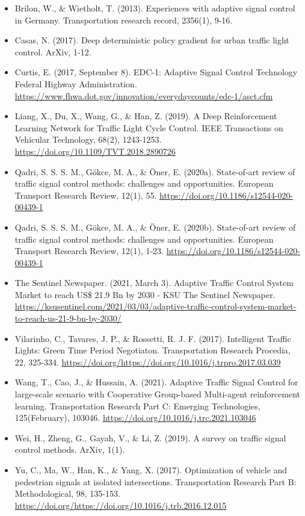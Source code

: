 \documentclass[
]{book}
\providecommand{\tightlist}{%
  \setlength{\itemsep}{0pt}\setlength{\parskip}{0pt}}
\begin{document}
\begin{itemize}
\tightlist
\item
  Brilon, W., \& Wietholt, T. (2013). Experiences with adaptive signal control in Germany. Transportation research record, 2356(1), 9-16.
\item
  Casas, N. (2017). Deep deterministic policy gradient for urban traffic light control. ArXiv, 1-12.
\item
  Curtis, E. (2017, September 8). EDC-1: Adaptive Signal Control Technology \textbar{} Federal Highway Administration. \url{https://www.fhwa.dot.gov/innovation/everydaycounts/edc-1/asct.cfm}
\item
  Liang, X., Du, X., Wang, G., \& Han, Z. (2019). A Deep Reinforcement Learning Network for Traffic Light Cycle Control. IEEE Transactions on Vehicular Technology, 68(2), 1243-1253. \url{https://doi.org/10.1109/TVT.2018.2890726}
\item
  Qadri, S. S. S. M., Gökce, M. A., \& Öner, E. (2020a). State-of-art review of traffic signal control methods: challenges and opportunities. European Transport Research Review, 12(1), 55. \url{https://doi.org/10.1186/s12544-020-00439-1}
\item
  Qadri, S. S. S. M., Gökce, M. A., \& Öner, E. (2020b). State-of-art review of traffic signal control methods: challenges and opportunities. European Transport Research Review, 12(1), 1-23. \url{https://doi.org/10.1186/s12544-020-00439-1}
\item
  The Sentinel Newspaper. (2021, March 3). Adaptive Traffic Control System Market to reach US\$ 21.9 Bn by 2030 - KSU \textbar{} The Sentinel Newspaper. \url{https://ksusentinel.com/2021/03/03/adaptive-traffic-control-system-market-to-reach-us-21-9-bn-by-2030/}
\item
  Vilarinho, C., Tavares, J. P., \& Rossetti, R. J. F. (2017). Intelligent Traffic Lights: Green Time Period Negotiaton. Transportation Research Procedia, 22, 325-334. \url{https://doi.org/https://doi.org/10.1016/j.trpro.2017.03.039}
\item
  Wang, T., Cao, J., \& Hussain, A. (2021). Adaptive Traffic Signal Control for large-scale scenario with Cooperative Group-based Multi-agent reinforcement learning. Transportation Research Part C: Emerging Technologies, 125(February), 103046. \url{https://doi.org/10.1016/j.trc.2021.103046}
\item
  Wei, H., Zheng, G., Gayah, V., \& Li, Z. (2019). A survey on traffic signal control methods. ArXiv, 1(1).
\item
  Yu, C., Ma, W., Han, K., \& Yang, X. (2017). Optimization of vehicle and pedestrian signals at isolated intersections. Transportation Research Part B: Methodological, 98, 135-153. \url{https://doi.org/https://doi.org/10.1016/j.trb.2016.12.015}
\end{itemize}
\end{document}
